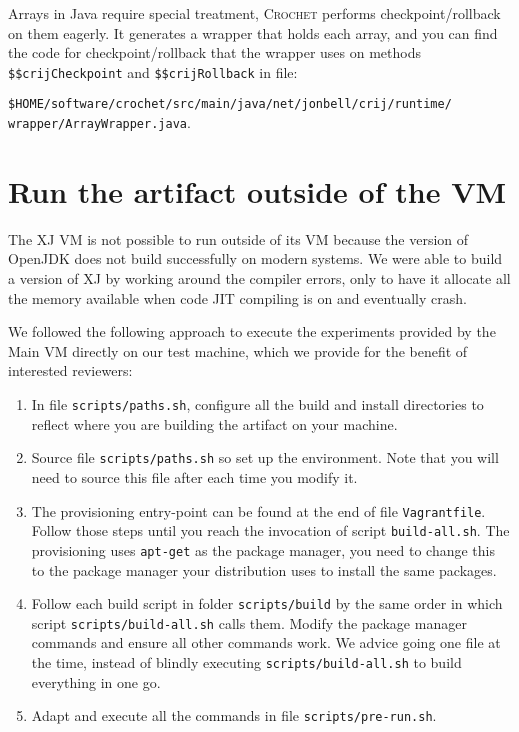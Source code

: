 \documentclass[12pt]{article}
\newcommand{\host}[1]{\colorbox{blue!20}{\texttt{\color{black}#1}}}
\newcommand{\vm}[1]{\colorbox{green!20}{\texttt{\color{black}#1}}}
\newcommand{\sysname}{\textsc{Crochet}\xspace}
\begin{document}
Arrays in Java require special treatment, \sysname performs checkpoint/rollback
on them eagerly.  It generates a wrapper that holds each array, and you can find
the code for checkpoint/rollback that the wrapper uses on methods
\texttt{\$\$crijCheckpoint} and \texttt{\$\$crijRollback} in file:

\vm{\$HOME/software/crochet/src/main/java/net/jonbell/crij/runtime/}\\\vm{wrapper/ArrayWrapper.java}.

\section{Run the artifact outside of the VM}
\label{sec:extract}
\label{sec:last}

The XJ VM is not possible to run outside of its VM because the version of
OpenJDK does not build successfully on modern systems.  We were able to build a
version of XJ by working around the compiler errors, only to have it allocate
all the memory available when code JIT compiling is on and eventually crash.

We followed the following approach to execute the experiments provided by the
Main VM directly on our test machine, which we provide for the benefit of interested reviewers:

\begin{enumerate}

    \item In file \host{scripts/paths.sh}, configure all the build and install
        directories to reflect where you are building the artifact on your
        machine.

    \item Source file \host{scripts/paths.sh} so set up the environment.  Note
        that you will need to source this file after each time you modify it.

    \item The provisioning entry-point can be found at the end of file
        \host{Vagrantfile}.  Follow those steps until you reach the invocation
        of script \texttt{build-all.sh}. The provisioning uses \texttt{apt-get}
        as the package manager, you need to change this to the package manager
        your distribution uses to install the same packages.

    \item Follow each build script in folder \host{scripts/build} by the same
        order in which script \host{scripts/build-all.sh} calls them.  Modify
        the package manager commands and ensure all other commands work.  We
        advice going one file at the time, instead of blindly executing
        \host{scripts/build-all.sh} to build everything in one go.

    \item Adapt and execute all the commands in file
        \host{scripts/pre-run.sh}.

\end{enumerate}
\end{document}
